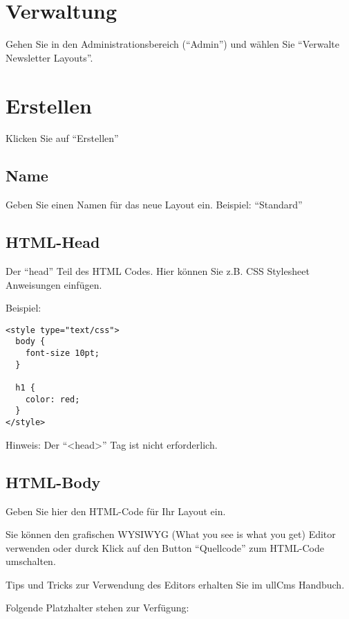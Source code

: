 \documentclass[article, a4paper, oneside, 11pt]{memoir}
\begin{document}
\section{Verwaltung}

Gehen Sie in den Administrationsbereich ("`Admin"') und wählen Sie "`Verwalte Newsletter Layouts"'.

\section{Erstellen}
\label{sec:create-layout}

Klicken Sie auf "`Erstellen"'

\subsection{Name}

Geben Sie einen Namen für das neue Layout ein. Beispiel: "`Standard"'

\subsection{HTML-Head}

Der "`head"' Teil des HTML Codes. Hier können Sie z.B. CSS Stylesheet Anweisungen einfügen.

Beispiel:

\begin{lstlisting}
<style type="text/css">
  body {
    font-size 10pt; 
  }
  
  h1 { 
    color: red;
  } 
</style>
\end{lstlisting}

Hinweis: Der "`<head>"' Tag ist nicht erforderlich.

\subsection{HTML-Body}

Geben Sie hier den HTML-Code für Ihr Layout ein.

Sie können den grafischen WYSIWYG (What you see is what you get) Editor verwenden oder durck Klick auf den Button "`Quellcode"' zum HTML-Code umschalten.

Tips und Tricks zur Verwendung des Editors erhalten Sie im ullCms Handbuch.


Folgende Platzhalter stehen zur Verfügung:
\end{document}
